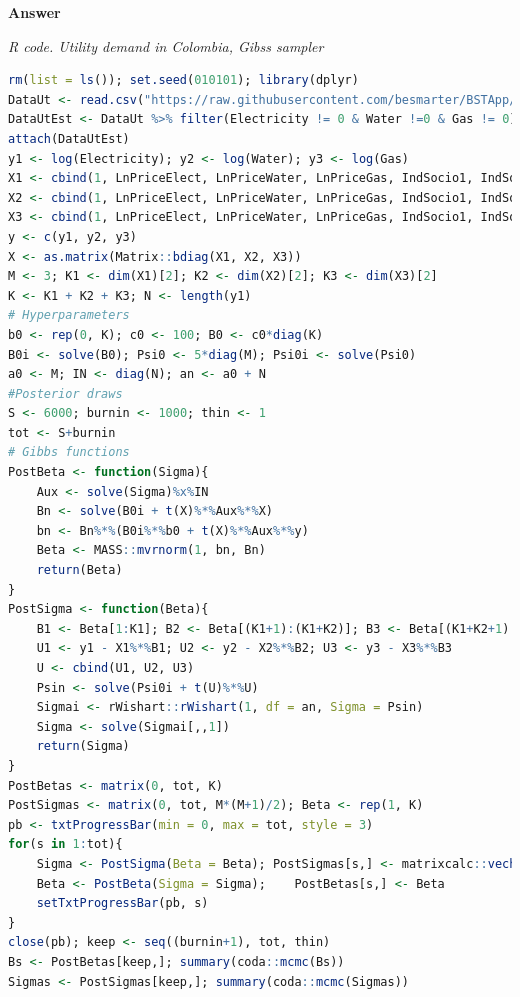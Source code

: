 \begin{enumerate}[leftmargin=*]
\textbf{Answer}

\begin{tcolorbox}[enhanced,width=4.67in,center upper,
	fontupper=\large\bfseries,drop shadow southwest,sharp corners]
	\textit{R code. Utility demand in Colombia, Gibss sampler}
	\begin{VF}
		\begin{lstlisting}[language=R]
rm(list = ls()); set.seed(010101); library(dplyr)
DataUt <- read.csv("https://raw.githubusercontent.com/besmarter/BSTApp/refs/heads/master/DataApp/Utilities.csv", sep = ",", header = TRUE, quote = "")
DataUtEst <- DataUt %>% filter(Electricity != 0 & Water !=0 & Gas != 0)
attach(DataUtEst)
y1 <- log(Electricity); y2 <- log(Water); y3 <- log(Gas)
X1 <- cbind(1, LnPriceElect, LnPriceWater, LnPriceGas, IndSocio1, IndSocio2, Altitude, Nrooms, HouseholdMem, Lnincome)
X2 <- cbind(1, LnPriceElect, LnPriceWater, LnPriceGas, IndSocio1, IndSocio2, Nrooms, HouseholdMem)
X3 <- cbind(1, LnPriceElect, LnPriceWater, LnPriceGas, IndSocio1, IndSocio2, Altitude, Nrooms, HouseholdMem)
y <- c(y1, y2, y3)
X <- as.matrix(Matrix::bdiag(X1, X2, X3))
M <- 3; K1 <- dim(X1)[2]; K2 <- dim(X2)[2]; K3 <- dim(X3)[2] 
K <- K1 + K2 + K3; N <- length(y1)
# Hyperparameters
b0 <- rep(0, K); c0 <- 100; B0 <- c0*diag(K)
B0i <- solve(B0); Psi0 <- 5*diag(M); Psi0i <- solve(Psi0)
a0 <- M; IN <- diag(N); an <- a0 + N
#Posterior draws
S <- 6000; burnin <- 1000; thin <- 1
tot <- S+burnin
# Gibbs functions
PostBeta <- function(Sigma){
	Aux <- solve(Sigma)%x%IN
	Bn <- solve(B0i + t(X)%*%Aux%*%X)
	bn <- Bn%*%(B0i%*%b0 + t(X)%*%Aux%*%y)
	Beta <- MASS::mvrnorm(1, bn, Bn)
	return(Beta)
}
PostSigma <- function(Beta){
	B1 <- Beta[1:K1]; B2 <- Beta[(K1+1):(K1+K2)]; B3 <- Beta[(K1+K2+1):(K1+K2+K3)]
	U1 <- y1 - X1%*%B1; U2 <- y2 - X2%*%B2; U3 <- y3 - X3%*%B3
	U <- cbind(U1, U2, U3)
	Psin <- solve(Psi0i + t(U)%*%U)
	Sigmai <- rWishart::rWishart(1, df = an, Sigma = Psin)
	Sigma <- solve(Sigmai[,,1]) 
	return(Sigma)
}
PostBetas <- matrix(0, tot, K)
PostSigmas <- matrix(0, tot, M*(M+1)/2); Beta <- rep(1, K)
pb <- txtProgressBar(min = 0, max = tot, style = 3)
for(s in 1:tot){
	Sigma <- PostSigma(Beta = Beta); PostSigmas[s,] <- matrixcalc::vech(Sigma)
	Beta <- PostBeta(Sigma = Sigma); 	PostBetas[s,] <- Beta
	setTxtProgressBar(pb, s)
}
close(pb); keep <- seq((burnin+1), tot, thin)
Bs <- PostBetas[keep,]; summary(coda::mcmc(Bs))
Sigmas <- PostSigmas[keep,]; summary(coda::mcmc(Sigmas))
\end{lstlisting}
	\end{VF}
\end{tcolorbox} 


\end{enumerate}
